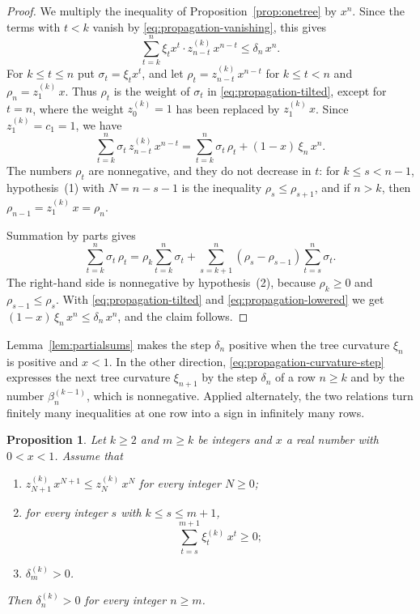 \documentclass{amsart}
\newtheorem{proposition}[theorem]{Proposition}
\theoremstyle{definition}
\theoremstyle{remark}
\numberwithin{equation}{section}
\begin{document}
\begin{proof}
We multiply the inequality of Proposition~\ref{prop:onetree} by $x^n$. Since
the terms with $t<k$ vanish by \eqref{eq:propagation-vanishing}, this gives
\begin{equation}\label{eq:propagation-tilted}
\sum_{t=k}^{n}\xi_tx^t\cdot z^{(k)}_{n-t}\,x^{n-t}\le\delta_n\,x^n .
\end{equation}
For $k\le t\le n$ put $\sigma_t=\xi_tx^t$, and let
$\rho_t=z^{(k)}_{n-t}\,x^{n-t}$ for $k\le t<n$ and $\rho_n=z^{(k)}_1\,x$.
Thus $\rho_t$ is the weight of $\sigma_t$ in \eqref{eq:propagation-tilted},
except for $t=n$, where the weight $z^{(k)}_0=1$ has been replaced by
$z^{(k)}_1\,x$. Since $z^{(k)}_1=c_1=1$, we have
\begin{equation}\label{eq:propagation-lowered}
\sum_{t=k}^{n}\sigma_t\,z^{(k)}_{n-t}\,x^{n-t}
=\sum_{t=k}^{n}\sigma_t\,\rho_t+(1-x)\,\xi_n\,x^n .
\end{equation}
The numbers $\rho_t$ are nonnegative, and they do not decrease in $t$: for
$k\le s<n-1$, hypothesis~(1) with $N=n-s-1$ is the inequality
$\rho_s\le\rho_{s+1}$, and if $n>k$, then $\rho_{n-1}=z^{(k)}_1\,x=\rho_n$.

Summation by parts gives
\[
\sum_{t=k}^{n}\sigma_t\,\rho_t=\rho_k\sum_{t=k}^{n}\sigma_t
+\sum_{s=k+1}^{n}(\rho_s-\rho_{s-1})\sum_{t=s}^{n}\sigma_t .
\]
The right-hand side is nonnegative by hypothesis~(2), because $\rho_k\ge0$
and $\rho_{s-1}\le\rho_s$. With \eqref{eq:propagation-tilted} and
\eqref{eq:propagation-lowered} we get
$(1-x)\,\xi_n\,x^n\le\delta_n\,x^n$, and the claim follows.
\end{proof}

Lemma~\ref{lem:partialsums} makes the step $\delta_n$ positive when the tree
curvature $\xi_n$ is positive and $x<1$. In the other direction,
\eqref{eq:propagation-curvature-step} expresses the next tree curvature
$\xi_{n+1}$ by the step $\delta_n$ of a row $n\ge k$ and by the number
$\beta^{(k-1)}_n$, which is nonnegative. Applied alternately, the two
relations turn finitely many inequalities at one row into a sign in
infinitely many rows.

\begin{proposition}\label{prop:propagation}
Let $k\ge2$ and $m\ge k$ be integers and $x$ a real number with $0<x<1$.
Assume that
\begin{enumerate}
\item $z^{(k)}_{N+1}\,x^{N+1}\le z^{(k)}_N\,x^N$ for every integer $N\ge0$;
\item for every integer $s$ with $k\le s\le m+1$,
\[
\sum_{t=s}^{m+1}\xi^{(k)}_t\,x^t\ge0 ;
\]
\item $\delta^{(k)}_m>0$.
\end{enumerate}
Then $\delta^{(k)}_n>0$ for every integer $n\ge m$.
\end{proposition}
\end{document}
